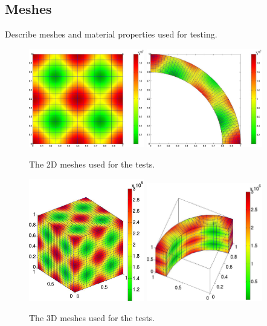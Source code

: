 
\subsection{Meshes}

Describe meshes and material properties used for testing.

\begin{figure}
	\includegraphics[width=0.45\textwidth]{figs/box}
	\includegraphics[width=0.45\textwidth]{figs/fan}
	\caption{\label{fig:mesh2d} The 2D meshes used for the tests.}
\end{figure}

\begin{figure}
	\includegraphics[width=0.45\textwidth]{figs/box3a}
	\includegraphics[width=0.45\textwidth]{figs/fan3a}
	\caption{\label{fig:mesh3d} The 3D meshes used for the tests.}
\end{figure}


